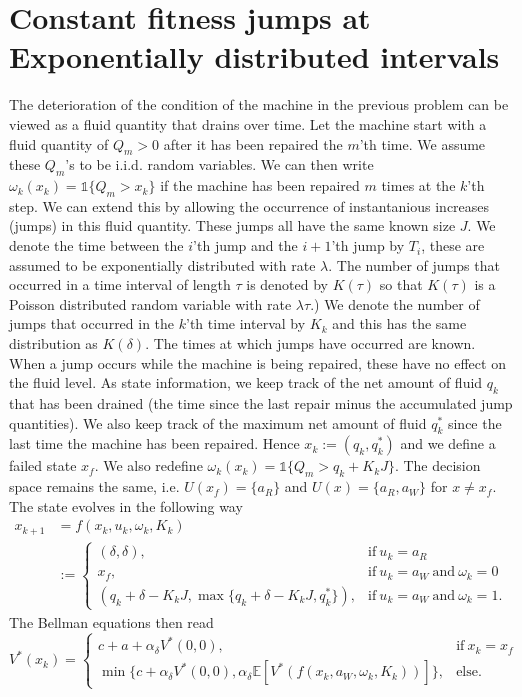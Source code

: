 
\section{Constant fitness jumps at Exponentially distributed intervals}
The deterioration of the condition of the machine in the previous problem can be viewed as a fluid quantity that drains over time.
Let the machine start with a fluid quantity of $Q_m>0$ after it has been repaired the $m$'th time.
We assume these $Q_m$'s to be i.i.d. random variables.
We can then write $\omega_k(x_k)=\mathds{1}\{Q_m>x_k\}$ if the machine has been repaired $m$ times at the $k$'th step.
We can extend this by allowing the occurrence of instantanious increases (jumps) in this fluid quantity.
These jumps all have the same known size $J$.
We denote the time between the $i$'th jump and the $i+1$'th jump by $T_i$, these are assumed to be exponentially distributed with rate $\lambda$.
The number of jumps that occurred in a time interval of length $\tau$ is denoted by $K(\tau)$ so that $K(\tau)$ is a Poisson distributed random variable with rate $\lambda \tau$.)
We denote the number of jumps that occurred in the $k$'th time interval by $K_k$ and this has the same distribution as $K(\delta)$.
The times at which jumps have occurred are known.
When a jump occurs while the machine is being repaired, these have no effect on the fluid level.
As state information, we keep track of the net amount of fluid $q_k$ that has been drained (the time since the last repair minus the accumulated jump quantities).
We also keep track of the maximum net amount of fluid $q^*_k$ since the last time the machine has been repaired. 
Hence $x_k:=(q_k,q^*_k)$ and we define a failed state $x_f$.
We also redefine $\omega_k(x_k)=\mathds{1}\{Q_m>q_k+K_kJ\}$.
The decision space remains the same, i.e. $U(x_f)=\{a_R\}$ and $U(x)=\{a_R,a_W\}$ for $x\neq x_f$.
The state evolves in the following way
\begin{equation}
\begin{split}
x_{k+1}&=f(x_k,u_k,\omega_k,K_k)\\
&:=\begin{cases}
(\delta,\delta),&\text{if}\ u_k=a_R \\
x_f,&\text{if}\ u_k=a_W\ \text{and}\ \omega_k=0 \\
(q_k+\delta-K_kJ,\max\{q_k+\delta-K_kJ,q^*_k\}),&\text{if}\ u_k=a_W\ \text{and}\ \omega_k=1.
\end{cases}
\end{split}
\end{equation}
The Bellman equations then read
\begin{equation}
V^*(x_k)=\begin{cases}
c+a+\alpha_\delta V^*(0,0),&\text{if}\ x_k=x_f\\
\min\{c+\alpha_\delta V^*(0,0),\alpha_\delta \mathbb{E}[V^*(f(x_k,a_W,\omega_k,K_k))]\},&\text{else.}
\end{cases}
\end{equation}


